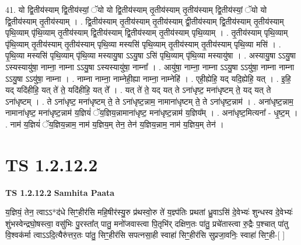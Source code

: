 \documentclass[17pt]{extarticle}
\begin{document}
41. यो द्वि॒तीय॑स्याम् द्वि॒तीय॑स्यां॒ ॅयो यो द्वि॒तीय॑स्याम् तृ॒तीय॑स्याम् तृ॒तीय॑स्याम् द्वि॒तीय॑स्यां॒ ॅयो यो द्वि॒तीय॑स्याम् तृ॒तीय॑स्याम् । . द्वि॒तीय॑स्याम् तृ॒तीय॑स्याम् तृ॒तीय॑स्याम् द्वी॒तीय॑स्याम् द्वि॒तीय॑स्याम् तृ॒तीय॑स्याम् पृथि॒व्याम् पृ॑थि॒व्याम् तृ॒तीय॑स्याम् द्वि॒तीय॑स्याम् द्वि॒तीय॑स्याम् तृ॒तीय॑स्याम् पृथि॒व्याम् । . तृ॒तीय॑स्याम् पृथि॒व्याम् पृ॑थि॒व्याम् तृ॒तीय॑स्याम् तृ॒तीय॑स्याम् पृथि॒व्या मस्यसि॑ पृथि॒व्याम् तृ॒तीय॑स्याम् तृ॒तीय॑स्याम् पृथि॒व्या मसि॑ । . पृ॒थि॒व्या मस्यसि॑ पृथि॒व्याम् पृ॑थि॒व्या मस्यायु॒षा ऽऽयु॒षा ऽसि॑ पृथि॒व्याम् पृ॑थि॒व्या मस्यायु॑षा । . अस्यायु॒षा ऽऽयु॒षा ऽस्यस्यायु॑षा॒ नाम्ना॒ नाम्ना ऽऽयु॒षा ऽस्यस्यायु॑षा॒ नाम्ना᳚ । . आयु॑षा॒ नाम्ना॒ नाम्ना ऽऽयु॒षा ऽऽयु॑षा॒ नाम्ना नाम्ना ऽऽयु॒षा ऽऽयु॑षा॒ नाम्ना । . नाम्ना नाम्ना॒ नाम्नेही॒ह्या नाम्ना॒ नाम्नेहि॑ । . एही॒ह्येहि॒ यद् यदि॒ह्येहि॒ यत् । . इ॒हि॒ यद् यदि॑हीहि॒ यत् ते॑ ते॒ यदि॑हीहि॒ यत् ते᳚ । . यत् ते॑ ते॒ यद् यत् ते ऽना॑धृष्ट॒ मना॑धृष्टम् ते॒ यद् यत् ते ऽना॑धृष्टम् । . ते ऽना॑धृष्ट॒ मना॑धृष्टम् ते॒ ते ऽना॑धृष्ट॒न्नाम॒ नामाना॑धृष्टम् ते॒ ते ऽना॑धृष्ट॒न्नाम॑ । . अना॑धृष्ट॒न्नाम॒ नामाना॑धृष्ट॒ मना॑धृष्ट॒न्नाम॑ य॒ज्ञियं॑ ॅय॒ज्ञिय॒न्नामाना॑धृष्ट॒ मना॑धृष्ट॒न्नाम॑ य॒ज्ञिय᳚म् । . अना॑धृष्ट॒मित्यना᳚ - धृ॒ष्ट॒म् । . नाम॑ य॒ज्ञियं॑ ॅय॒ज्ञिय॒न्नाम॒ नाम॑ य॒ज्ञिय॒म् तेन॒ तेन॑ य॒ज्ञिय॒न्नाम॒ नाम॑ य॒ज्ञिय॒म् तेन॑ । \newline
\pagebreak
{}

\section{ TS 1.2.12.2 }

\textbf{TS 1.2.12.2 } \newline
\textbf{Samhita Paata} \newline

य॒ज्ञियं॒ तेन॒ त्वाऽऽ*द॑धे सिꣳ॒॒हीर॑सि महि॒षीर॑स्यु॒रु प्र॑थस्वो॒रु ते॑ य॒ज्ञ्प॑तिः प्रथतां ध्रु॒वाऽसि॑ दे॒वेभ्यः॑ शुन्धस्व दे॒वेभ्यः॑ शुंभस्वेन्द्रघो॒षस्त्वा॒ वसु॑भिः पु॒रस्ता᳚त् पातु॒ मनो॑जवास्त्वा पि॒तृभि॑र् दक्षिण॒तः पा॑तु॒ प्रचे॑तास्त्वा रु॒द्रैः प॒श्चात् पा॑तु वि॒श्वक॑र्मा त्वाऽऽदि॒त्यैरु॑त्तर॒तः पा॑तु॒ सिꣳ॒॒हीर॑सि सपत्नसा॒ही स्वाहा॑ सिꣳ॒॒हीर॑सि सुप्रजा॒वनिः॒ स्वाहा॑ सिꣳ॒॒ही-[ ] \newline
\end{document}

